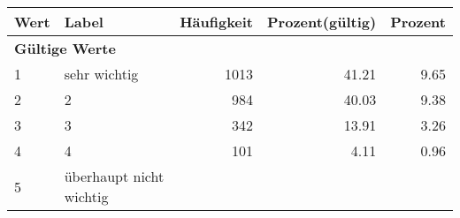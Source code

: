      \begin{longtable}{lXrrr}
     \toprule
     \textbf{Wert} & \textbf{Label} & \textbf{Häufigkeit} & \textbf{Prozent(gültig)} & \textbf{Prozent} \\
     \endhead
     \midrule
     \multicolumn{5}{l}{\textbf{Gültige Werte}}\\

     1 &
     \multicolumn{1}{X}{ sehr wichtig   } &


       \num{1013} &
       \num[round-mode=places,round-precision=2]{41,21} &
         \num[round-mode=places,round-precision=2]{9,65} \\

     2 &
     \multicolumn{1}{X}{ 2   } &


       \num{984} &
       \num[round-mode=places,round-precision=2]{40,03} &
         \num[round-mode=places,round-precision=2]{9,38} \\

     3 &
     \multicolumn{1}{X}{ 3   } &


       \num{342} &
       \num[round-mode=places,round-precision=2]{13,91} &
         \num[round-mode=places,round-precision=2]{3,26} \\

     4 &
     \multicolumn{1}{X}{ 4   } &


       \num{101} &
       \num[round-mode=places,round-precision=2]{4,11} &
         \num[round-mode=places,round-precision=2]{0,96} \\

     5 &
     \multicolumn{1}{X}{ überhaupt nicht wichtig   } &



\end{longtable}
